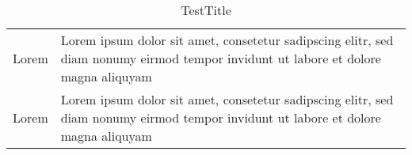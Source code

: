 
\begin{table}[htb]



\begin{tabularx}{\textwidth}{l>{\hsize=1.00\hsize}X}
\toprule
\toprule

Lorem
&

Lorem ipsum dolor sit amet, consetetur sadipscing elitr, sed diam nonumy eirmod tempor invidunt ut labore et dolore magna aliquyam
\\

Lorem
&

Lorem ipsum dolor sit amet, consetetur sadipscing elitr, sed diam nonumy eirmod tempor invidunt ut labore et dolore magna aliquyam
\\
\bottomrule
\end{tabularx}
\caption{TestTitle}
\end{table}
